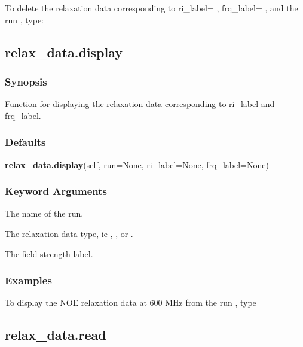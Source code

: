 To delete  the relaxation  data corresponding to ri\_label=
, frq\_label=
, and the run
, type:




\newpage

\subsection{relax\_data.display}


\subsubsection{Synopsis}

Function for displaying the relaxation data corresponding to ri\_label and frq\_label.

\subsubsection{Defaults}

\textsf{\textbf{relax\_data.display}(self, run=None, ri\_label=None, frq\_label=None)}


\subsubsection{Keyword Arguments}


  The name of the run.

  The relaxation  data type, ie 
, 
, or 
.

  The field strength label.

\subsubsection{Examples}

To display  the NOE relaxation  data at 600 MHz from the run 
, type




\newpage

\subsection{relax\_data.read}


